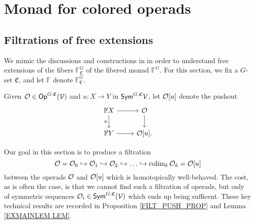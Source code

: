 \documentclass[a4paper,10pt
,draft
]{article}%
\renewcommand{\1}{\eta}%
\begin{document}
\section{Monad for colored operads}
\label{MONAD_APDX}

\subsection{Filtrations of free extensions} %

We mimic the discussions and constructions in \cite[\S 5.1 - 5.3]{BP_geo}
in order to understand free extensions of the fibers $\mathbb F^G_{\mathfrak C}$ of the fibered monad $\mathbb F^G$.
For this section, we fix a $G$-set $\mathfrak C$, and let $\mathbb F$ denote $\mathbb F^G_{\mathfrak C}$.

\begin{definition}
      Given $\mathcal{O} \in \mathsf{Op}^{G, \mathfrak C}(\mathcal V)$ and $u: X \to Y$ in $\mathsf{Sym}^{G,\mathfrak C}\mathcal V$,
      let $\mathcal {\mathcal{O}}[u]$ denote the pushout
      \begin{equation}
            \label{OU_EQ}
            \begin{tikzcd}
                  \mathbb F X \arrow[d, "u"'] \arrow[r]
                  &
                  \O \arrow[d]
                  \\
                  \mathbb F Y \arrow[r]
                  &
                  \O[u].
            \end{tikzcd}
      \end{equation}
\end{definition}

Our goal in this section is to produce a filtration
\begin{equation}
      \label{FILT_EQ}
      \O = \O_0 \into \O_1 \into \O_2 \into \dots \into \colim_k \O_k = \O[u]
\end{equation}
between the operads $\mathcal{O}$ and $\mathcal{O}[u]$
which is homotopically well-behaved.
The cost, as is often the case, is that we cannot find such a filtration of operads,
but only of symmetric sequences $\mathcal{O}_i \in \mathsf{Sym}^{G, \mathfrak C}(\mathcal V)$
which ends up being sufficent.
These key technical results are recorded in Proposition \ref{FILT_PUSH_PROP} and Lemma \ref{EXMAINLEM LEM}.
\end{document}
